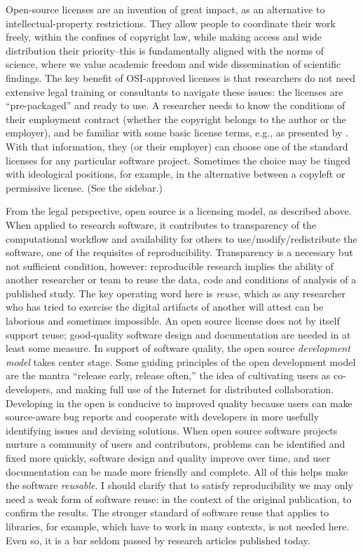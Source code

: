 \documentclass{statement}
\newlength{\up}
\begin{document}
Open-source licenses are an invention of great impact, as an alternative to intellectual-property restrictions. 
They allow people to coordinate their work freely, within the confines of copyright law, while making access and wide distribution their priority--this is fundamentally aligned with the norms of science, where we value academic freedom and wide dissemination of scientific findings. 
The key benefit of OSI-approved licenses is that researchers do not need extensive legal training or consultants to navigate these issues: 
the licenses are ``pre-packaged'' and ready to use. 
A researcher needs to know the conditions of their employment contract (whether the copyright belongs to the author or the employer), and be familiar with some basic license terms, e.g., as presented by \cite{morin2012}. 
With that information, they (or their employer) can choose one of the standard licenses for any particular software project. 
Sometimes the choice may be tinged with ideological positions, for example, in the alternative between a copyleft or permissive license. (See the sidebar.)

From the legal perspective, open source is a licensing model, as described above. 
When applied to research software, it contributes to transparency of the computational workflow and availability for others to use/modify/redistribute the software, one of the requisites of reproducibility. 
Transparency is a necessary but not sufficient condition, however: reproducible research implies the ability of another researcher or team to reuse the data, code and conditions of analysis of a published study. 
The key operating word here is \emph{reuse}, which as any researcher who has tried to exercise the digital artifacts of another will attest can be laborious and sometimes impossible. 
An open source license does not by itself support reuse; good-quality software design and documentation are needed in at least some measure. 
In support of software quality, the open source \emph{development model }takes center stage. 
Some guiding principles of the open development model are the mantra ``release early, release often,'' the idea of cultivating users as co-developers, and making full use of the Internet for distributed collaboration. 
Developing in the open is conducive to improved quality because users can make source-aware bug reports and cooperate with developers in more usefully identifying issues and devising solutions. 
When open source software projects nurture a community of users and contributors, problems can be identified and fixed more quickly, software design and quality improve over time, and user documentation can be made more friendly and complete. 
All of this helps make the software \emph{reusable}.
I should clarify that to satisfy reproducibility we may only need a weak form of software reuse: in the context of the original publication, to confirm the results. 
The stronger standard of software reuse that applies to libraries, for example, which have to work in many contexts, is not needed here. 
Even so, it is a bar seldom passed by research articles published today.
\end{document}
